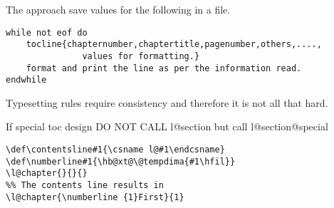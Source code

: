 The approach save values for the following in a file.

\begin{lstlisting}
while not eof do
    tocline{chapternumber,chaptertitle,pagenumber,others,....,
               values for formatting.}
    format and print the line as per the information read.
endwhile
\end{lstlisting}

Typesetting rules require consistency and therefore it is not all that hard.

If special toc design DO NOT CALL l@section but call l@section@special

\begin{lstlisting}
\def\contentsline#1{\csname l@#1\endcsname}
\def\numberline#1{\hb@xt@\@tempdima{#1\hfil}}
\l@chapter{}{}{}
%% The contents line results in
\l@chapter{\numberline {1}First}{1}
\end{lstlisting}
